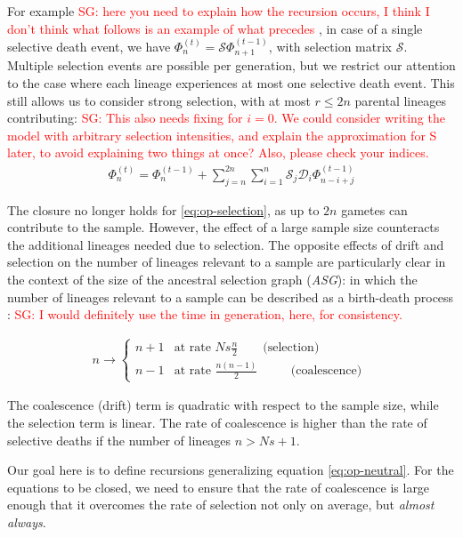 \documentclass[review]{elsarticle}
\newcommand{\ra}{\rightarrow}
\newcommand{\sgcomment}[1]{\textcolor{red}{SG: #1}}
\begin{document}
For example  \sgcomment{here you need to explain how the recursion occurs, I think I don't think what follows is an example of what precedes }, in case of a single selective death event, we have
$\Phi_{n}^{(t)}=\mathcal{S}\Phi_{n+1}^{(t-1)}$, with selection matrix $\mathcal{S}$. Multiple
selection events are possible per generation, but we restrict our attention to the case where each
lineage experiences at most one selective death event. This still allows us to consider strong
selection, with at most $r\le 2n$ parental lineages contributing: \sgcomment{This also needs fixing for $i=0$. We could consider writing the model with arbitrary selection intensities, and explain the approximation for S later, to avoid explaining two things at once? Also, please check your indices. }
\begin{align}
  \label{eq:op-selection}
  \Phi_{n}^{(t)}=\Phi_{n}^{(t-1)}+ \sum_{j=n}^{2n} \sum_{i=1}^{n} \mathcal{S}_j \mathcal{D}_i \Phi_{n-i+j}^{(t-1)}
\end{align}

The closure no longer holds for \eqref{eq:op-selection}, as up to $2n$ gametes can contribute to the
sample. However, the effect of a large sample size counteracts the additional lineages needed due to
selection. The opposite effects of drift and selection on the number of lineages relevant to a
sample are particularly clear in the context of the size of the ancestral selection graph
(\textit{ASG}): in which the number of lineages relevant to a sample can be described as a
birth-death process \citep{KroneNeuhauser1997, Wakeley2009}: \sgcomment{I would definitely use the time in generation, here, for consistency.}

\begin{align}
  \label{eq:asg-size}
  n \ra \begin{cases}
    n+1 & \text{at rate } Ns \frac{n}{2} \hspace{20pt} \text{ (selection) }\\
    n-1 & \text{at rate } \frac{n(n-1)}{2}   \hspace{28pt} \text{ (coalescence) }
  \end{cases}
\end{align}

The coalescence (drift) term is quadratic with respect to the sample size, while the selection term
is linear. The rate of coalescence is higher than the rate of selective deaths if the number of
lineages $n>Ns+1$.

Our goal here is to define recursions generalizing equation \eqref{eq:op-neutral}. For the equations
to be closed, we need to ensure that the rate of coalescence is large enough that it overcomes the
rate of selection not only on average, but \emph{almost always}.
\end{document}
